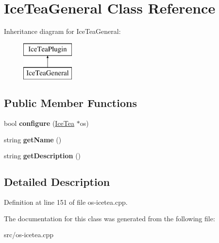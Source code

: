\hypertarget{class_ice_tea_general}{}\section{Ice\+Tea\+General Class Reference}
\label{class_ice_tea_general}
Inheritance diagram for Ice\+Tea\+General\+:\begin{figure}[H]
\begin{center}
\leavevmode
\includegraphics[height=2.000000cm]{class_ice_tea_general}
\end{center}
\end{figure}
\subsection*{Public Member Functions}
\begin{DoxyCompactItemize}
\item 
bool {\bfseries configure} (\hyperlink{class_ice_tea}{Ice\+Tea} $\ast$os)\hypertarget{class_ice_tea_general_ad087541bed4ccfb45f7cb0f970297196}{}\label{class_ice_tea_general_ad087541bed4ccfb45f7cb0f970297196}

\item 
string {\bfseries get\+Name} ()\hypertarget{class_ice_tea_general_af4f039eb5aa8fd6c9c3a4373fb947431}{}\label{class_ice_tea_general_af4f039eb5aa8fd6c9c3a4373fb947431}

\item 
string {\bfseries get\+Description} ()\hypertarget{class_ice_tea_general_a3e9dce46e0e4c949a1e33cdc1a34179d}{}\label{class_ice_tea_general_a3e9dce46e0e4c949a1e33cdc1a34179d}

\end{DoxyCompactItemize}


\subsection{Detailed Description}


Definition at line 151 of file os-\/icetea.\+cpp.



The documentation for this class was generated from the following file\+:\begin{DoxyCompactItemize}
\item 
src/os-\/icetea.\+cpp\end{DoxyCompactItemize}
